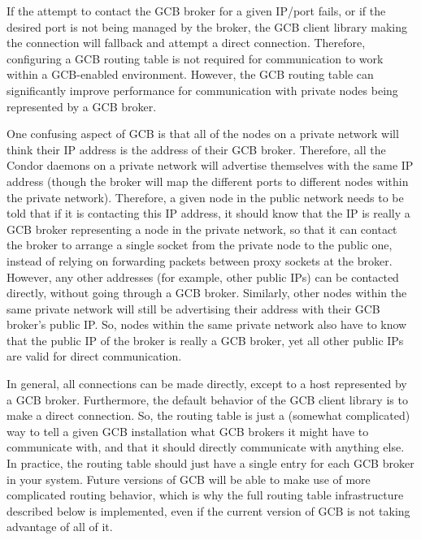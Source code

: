 If the attempt to contact the GCB broker for a given IP/port fails, or
if the desired port is not being managed by the broker, the GCB client
library making the connection will fallback and attempt a direct
connection.
Therefore, configuring a GCB routing table is not required for
communication to work within a GCB-enabled environment.
However, the GCB routing table can significantly improve performance
for communication with private nodes being represented by a GCB
broker. 

One confusing aspect of GCB is that all of the nodes on a private
network will think their IP address is the address of their GCB
broker.
Therefore, all the Condor daemons on a private network will advertise
themselves with the same IP address (though the broker will map the
different ports to different nodes within the private network).
Therefore, a given node in the public network needs to be told that if
it is contacting this IP address, it should know that the IP is really
a GCB broker representing a node in the private network, so that it
can contact the broker to arrange a single socket from the private
node to the public one, instead of relying on forwarding packets
between proxy sockets at the broker.
However, any other addresses (for example, other public IPs) can be
contacted directly, without going through a GCB broker.
Similarly, other nodes within the same private network will still be
advertising their address with their GCB broker's public IP.
So, nodes within the same private network also have to know that the
public IP of the broker is really a GCB broker, yet all other public
IPs are valid for direct communication.

In general, all connections can be made directly, except to a host
represented by a GCB broker.
Furthermore, the default behavior of the GCB client library is to make
a direct connection.
So, the routing table is just a (somewhat complicated) way to tell a
given GCB installation what GCB brokers it might have to communicate
with, and that it should directly communicate with anything else.
In practice, the routing table should just have a single entry for
each GCB broker in your system.
Future versions of GCB will be able to make use of more complicated
routing behavior, which is why the full routing table infrastructure
described below is implemented, even if the current version of GCB is
not taking advantage of all of it.



